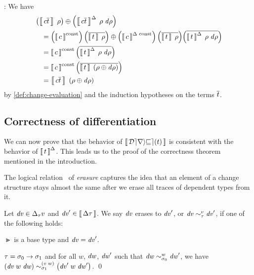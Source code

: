 \begin{optionalproof}
  \Case {}: We have
  \begin{align*}
    &         \Apply
                {\EvalIncWith*{\Const{c}{\List{t}}}{\Gr}{\D \Gr}}
                {\EvalWith*{\Const{c}{\List{t}}}{\Gr}}\\
    & \quad = \Apply
                {\EvalIncConst*
                  {\Const{c}}
                  {\List*{\EvalWith{t}{\Gr}}}
                  {\List*{\EvalIncWith{t}{\Gr}{\D \Gr}}}}
                {\EvalConst*
                  {\Const{c}}
                  {\List*{\EvalWith{t}{\Gr}}}}\\
    & \quad = \EvalConst
                {c}
                {\List*{\EvalIncWith{t}{\Gr}{\D \Gr}}}\\
    & \quad = \EvalConst
                {c}
                {\List*{\EvalWith{t}{\Apply*{\D \Gr}{\Gr}}}}\\
    & \quad = \EvalWith
                {\Const{c}{\List{t}}}
                {\Apply*{\D \Gr}{\Gr}}
  \end{align*}
  by \cref{def:change-evaluation} and
  the induction hypotheses on the terms $\List{t}$.
\end{optionalproof}

\subsection{Correctness of differentiation}
\label{sec:differentiate-correct}


We can now
prove that the behavior of $\Eval{\Derive{t}}$ is consistent with
the behavior of $\EvalInc{t}$. This leads us to the proof of the
correctness theorem mentioned in the introduction.

The logical relation~\citep[Chapter 8]{Mitchell1996foundations}
of \emph{erasure} captures the idea that an
element of a change structure stays almost the same after we
erase all traces of dependent types from it.

\begin{definition}[Erasure]\label{def:erasure}
Let $\D v \in \Change[\Gt]v$ and $\D v' \in \Eval{\Change\Gt}$.
We say $\mathit{dv}$ erases to $\mathit{dv}'$, or
$\Implements[\Gt][v]{\D v}{\D v'}$,
if one of the following holds:
\begin{subdefinition}
\item $\Gt$ is a base type and $\mathit{dv}=\mathit{dv}'$.
\item $\Gt=\Fun{\Gs_0}{\Gs_1}$ and for all $w$, $\mathit{dw}$, $\mathit{dw}'$
such that $\Implements[\Gs_0][w]{\D w}{\D w'}$, we have
$\Implements[\Gs_1][\App* v w]
{\App*{\App{\D v}w}{\D w}}
{\App*{\App{\D v'}w}{\D w'}}$. \qed
\end{subdefinition}
\end{definition}

